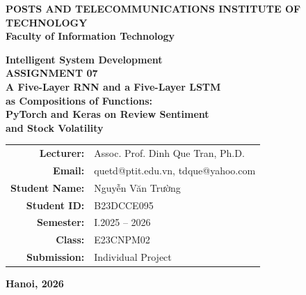\documentclass[11pt, a4paper]{article}
\begin{document}
\begin{titlepage}
\begin{center}

\vspace*{0.5cm}

\Large
\textbf{POSTS AND TELECOMMUNICATIONS INSTITUTE OF TECHNOLOGY}\\
\textbf{Faculty of Information Technology}

\vspace{2.0cm}

\Huge
\textbf{Intelligent System Development}\\
\vspace{0.4cm}
\LARGE
\textbf{ASSIGNMENT 07}\\
\vspace{0.6cm}
\Large
\textbf{A Five-Layer RNN and a Five-Layer LSTM\\as Compositions of Functions:\\PyTorch and Keras on Review Sentiment\\and Stock Volatility}

\vspace{1.2cm}

\vfill

\normalsize
\begin{tabular}{rl}
\textbf{Lecturer:} & Assoc. Prof. Dinh Que Tran, Ph.D. \\
\textbf{Email:} & quetd@ptit.edu.vn, tdque@yahoo.com \\[0.8cm]
\textbf{Student Name:} & Nguyễn Văn Trường \\
\textbf{Student ID:} & B23DCCE095 \\
\textbf{Semester:} & I.2025 -- 2026 \\
\textbf{Class:} & E23CNPM02 \\
\textbf{Submission:} & Individual Project \\
\end{tabular}

\vfill

\textbf{Hanoi, 2026}

\vspace{0.5cm}

\end{center}
\end{titlepage}

{
    \hypersetup{linkcolor=black}
    \tableofcontents
}
\newpage
\end{document}
